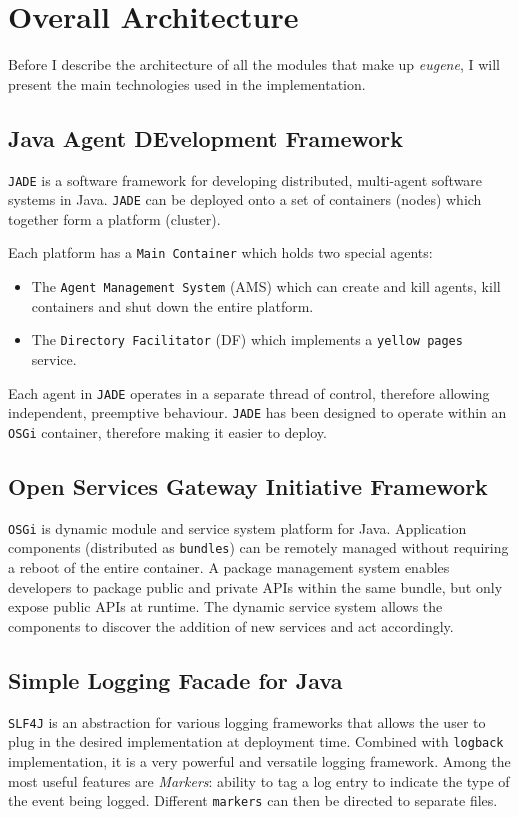 \section{Overall Architecture}
Before I describe the architecture of all the modules that make up \textit{eugene}, I will present the main technologies used in the implementation.

\subsection{Java Agent DEvelopment Framework}
\texttt{JADE} is a software framework for developing distributed, multi-agent software systems in Java. \texttt{JADE} can be deployed onto a set of containers (nodes) which together form a platform (cluster).

Each platform has a \texttt{Main Container} which holds two special agents:
\begin{itemize}
\item The \texttt{Agent Management System} (AMS) which can create and kill agents, kill containers and shut down the entire platform.
\item The \texttt{Directory Facilitator} (DF) which implements a \texttt{yellow pages} service.
\end{itemize} 

Each agent in \texttt{JADE} operates in a separate thread of control, therefore allowing independent, preemptive behaviour. \texttt{JADE}  has been designed to operate within an \texttt{OSGi} container, therefore making it easier to deploy.

\subsection{Open Services Gateway Initiative Framework}
\texttt{OSGi} is dynamic module and service system platform for Java. Application components (distributed as \texttt{bundles}) can be remotely managed without requiring a reboot of the entire container. A package management system enables developers to package public and private APIs within the same bundle, but only expose public APIs at runtime. The dynamic service system allows the components to discover the addition of new services and act accordingly.

\subsection{Simple Logging Facade for Java}
\texttt{SLF4J} is an abstraction for various logging frameworks that allows the user to plug in the desired implementation at deployment time. Combined with \texttt{logback} implementation, it is a very powerful and versatile logging framework. Among the most useful features are \textit{Markers}: ability to tag a log entry to indicate the type of the event being logged. Different \texttt{markers} can then be directed to separate files.
